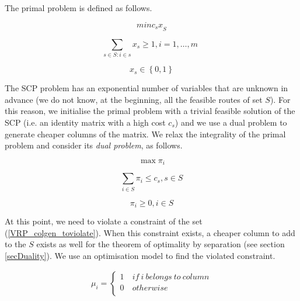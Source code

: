The primal problem is defined as follows.

\begin{equation}
   min {c_sx}_S
\end{equation}

\begin{equation}
   \sum_{s\in S:i\in s}{x_s\geq1}, i=1,\ldots,m\ \ 
\end{equation}

\begin{equation}
    x_s\in\left\{0,1\right\}
\end{equation}

The SCP problem has an exponential number of variables that are unknown in advance (we do not know, at the beginning, all the feasible routes of set $S$). For this reason, we initialise the primal problem with a trivial feasible solution of the SCP (i.e. an identity matrix with a high cost $c_s$) and we use a dual problem to generate cheaper columns of the matrix. We relax the integrality of the primal problem and consider its \textit{dual problem}, as follows.

\begin{equation}
    \max{\pi_i}
\end{equation}

\begin{equation}
    \sum_{i\in S}{\pi_i\le c_s}, s\in S
    \label{VRP_colgen_toviolate}
\end{equation}

\begin{equation}
    \pi_i\geq0, i\in S
\end{equation}

At this point, we need to violate a constraint of the set (\ref{VRP_colgen_toviolate}). When this constraint exists, a cheaper column to add to the $S$ exists as well for the theorem of optimality by separation (see section \ref{secDuality}). We use an optimisation model to find the violated constraint.

\begin{equation}
   \begin{split}
   \mu_i=\left\{
                \begin{array}{ll}
                  1\ & if\ i\ belongs\ to\ column\\
                  0 & otherwise\\
                \end{array}
              \right.
   \end{split}
\end{equation}

